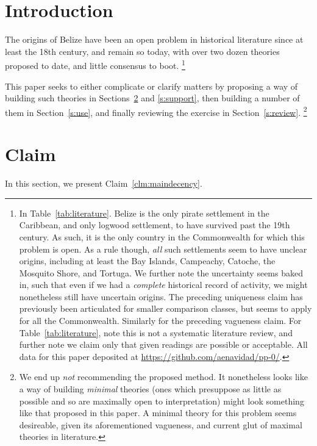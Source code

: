 
%
%
%
\section{Introduction}
\label{s:intro}
	The origins of Belize have been an open problem in historical literature since at least the 18th century, and remain so today, with over two dozen theories proposed to date, and little consensus to boot.%
	\footnote{In Table~\ref{tab:literature}. Belize is the only pirate settlement in the Caribbean, and only logwood settlement, to have survived past the 19th century. As such, it is the only country in the Commonwealth for which this problem is open. As a rule though, \emph{all} such settlements seem to have unclear origins, including at least the Bay Islands, Campeachy, Catoche, the Mosquito Shore, and Tortuga. We further note the uncertainty seems baked in, such that even if we had a \emph{complete} historical record of activity, we might nonetheless still have uncertain origins. The preceding uniqueness claim has previously been articulated for smaller comparison classes, but seems to apply for all the Commonwealth. Similarly for the preceding vagueness claim. For Table~\ref{tab:literature}, note this is not a systematic literature review, and further note we claim only that given readings are possible or acceptable. All data for this paper deposited at \url{https://github.com/aenavidad/pp-0/}.}
	
	This paper seeks to either complicate or clarify matters by proposing a way of building such theories in Sections~\ref{s:claim} and \ref{s:support}, then building a number of them in Section~\ref{s:use}, and finally reviewing the exercise in Section~\ref{s:review}.%
	\footnote{We end up \emph{not} recommending the proposed method. It nonetheless looks like a way of building \emph{minimal} theories (ones which presuppose as little as possible and so are maximally open to interpretation) might look something like that proposed in this paper. A minimal theory for this problem seems desireable, given its aforementioned vagueness, and current glut of maximal theories in literature.}
%
%
%
\section{Claim}
\label{s:claim}
	In this section, we present Claim~\ref{clm:maindecency}.
	
